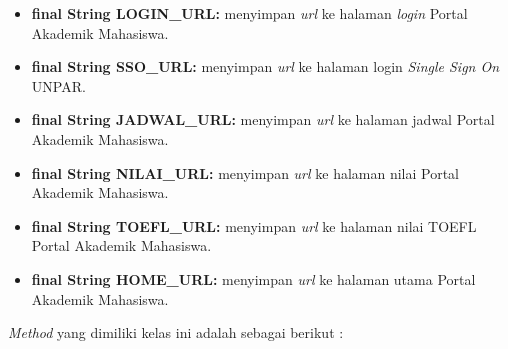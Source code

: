 \begin{enumerate}
\begin{itemize}
            \item \textbf{final String LOGIN_URL:} menyimpan \textit{url} ke halaman \textit{login} Portal Akademik Mahasiswa.
            \item \textbf{final String SSO_URL:} menyimpan \textit{url} ke halaman login \textit{Single Sign On} UNPAR.
            \item \textbf{final String JADWAL_URL:} menyimpan \textit{url} ke halaman jadwal Portal Akademik Mahasiswa.
            \item \textbf{final String NILAI_URL:} menyimpan \textit{url} ke halaman nilai Portal Akademik Mahasiswa.
            \item \textbf{final String TOEFL_URL:} menyimpan \textit{url} ke halaman nilai TOEFL Portal Akademik Mahasiswa.
            \item \textbf{final String HOME_URL:} menyimpan \textit{url} ke halaman utama Portal Akademik Mahasiswa.

		\end{itemize}
		
		\textit{Method} yang dimiliki kelas ini adalah sebagai berikut :
		\begin{itemize}
			

\end{itemize}
\end{enumerate}
